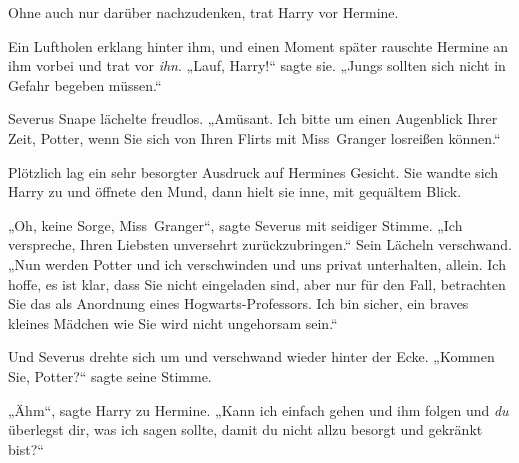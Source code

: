 Ohne auch nur darüber nachzudenken, trat Harry vor Hermine.

Ein Luftholen erklang hinter ihm, und einen Moment später rauschte Hermine an ihm vorbei und trat vor \emph{ihn}.
„Lauf, Harry!“ sagte sie.
„Jungs sollten sich nicht in Gefahr begeben müssen.“

Severus Snape lächelte freudlos.
„Amüsant. Ich bitte um einen Augenblick Ihrer Zeit, Potter, wenn Sie sich von Ihren Flirts mit Miss~Granger losreißen können.“

Plötzlich lag ein sehr besorgter Ausdruck auf Hermines Gesicht. Sie wandte sich Harry zu und öffnete den Mund, dann hielt sie inne, mit gequältem Blick.

„Oh, keine Sorge, Miss~Granger“, sagte Severus mit seidiger Stimme.
„Ich verspreche, Ihren Liebsten unversehrt zurückzubringen.“ Sein Lächeln verschwand.
„Nun werden Potter und ich verschwinden und uns privat unterhalten, allein. Ich hoffe, es ist klar, dass Sie nicht eingeladen sind, aber nur für den Fall, betrachten Sie das als Anordnung eines Hogwarts-Professors. Ich bin sicher, ein braves kleines Mädchen wie Sie wird nicht ungehorsam sein.“

Und Severus drehte sich um und verschwand wieder hinter der Ecke.
„Kommen Sie, Potter?“ sagte seine Stimme.

„Ähm“, sagte Harry zu Hermine.
„Kann ich einfach gehen und ihm folgen und \emph{du} überlegst dir, was ich sagen sollte, damit du nicht allzu besorgt und gekränkt bist?“

